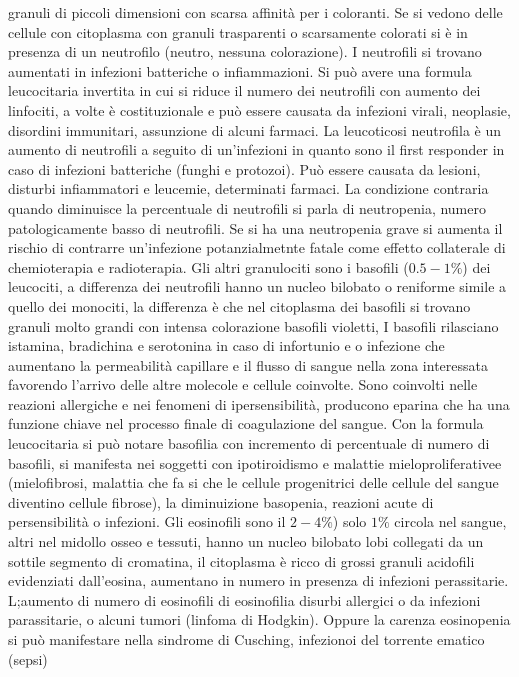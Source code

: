 granuli di piccoli dimensioni con scarsa affinit\`a per i coloranti. Se si vedono delle cellule con citoplasma con granuli trasparenti o scarsamente colorati si \`e in presenza di un
neutrofilo (neutro, nessuna colorazione). I neutrofili si trovano aumentati in infezioni batteriche o infiammazioni. Si pu\`o avere una formula leucocitaria invertita in cui si riduce il
numero dei neutrofili con aumento dei linfociti, a volte \`e costituzionale e pu\`o essere causata da infezioni virali, neoplasie, disordini immunitari, assunzione di alcuni farmaci. 
La leucoticosi neutrofila \`e un aumento di neutrofili a seguito di un'infezioni in quanto sono il first responder in caso di infezioni batteriche (funghi e protozoi). Pu\`o essere 
causata da lesioni, disturbi infiammatori e leucemie, determinati farmaci. La condizione contraria quando diminuisce la percentuale di neutrofili si parla di neutropenia, numero 
patologicamente basso di neutrofili. Se si ha una neutropenia grave si aumenta il rischio di contrarre un'infezione potanzialmetnte fatale come effetto collaterale di chemioterapia e 
radioterapia. Gli altri granulociti sono i basofili ($0.5-1\%$) dei leucociti, a differenza dei neutrofili hanno un nucleo bilobato o reniforme simile a quello dei monociti, la differenza
\`e che nel citoplasma dei basofili si trovano granuli molto grandi con intensa colorazione basofili violetti, I basofili rilasciano istamina, bradichina e serotonina in caso di
infortunio e o infezione che aumentano la permeabilit\`a capillare e il flusso di sangue nella zona interessata favorendo l'arrivo delle altre molecole e cellule coinvolte. Sono coinvolti
nelle reazioni allergiche e nei fenomeni di ipersensibilit\`a, producono eparina che ha una funzione chiave nel processo finale di coagulazione del sangue. Con la formula leucocitaria 
si pu\`o notare basofilia con incremento di percentuale di numero di basofili, si manifesta nei soggetti con ipotiroidismo e malattie mieloproliferativee (mielofibrosi, malattia che
fa si che le cellule progenitrici delle cellule del sangue diventino cellule fibrose), la diminuizione basopenia, reazioni acute di persensibilit\`a o infezioni. Gli eosinofili sono
il $2-4\%$) solo $1\%$ circola nel sangue, altri nel midollo osseo e tessuti, hanno un nucleo bilobato lobi collegati da un sottile segmento di cromatina, il citoplasma \`e ricco di 
grossi  granuli acidofili evidenziati dall'eosina, aumentano in numero in presenza di infezioni perassitarie. L;aumento di numero di eosinofili di eosinofilia disurbi allergici o 
da infezioni parassitarie, o alcuni tumori (linfoma di Hodgkin). Oppure la carenza eosinopenia si pu\`o manifestare nella sindrome di Cusching, infezionoi del torrente ematico (sepsi)
